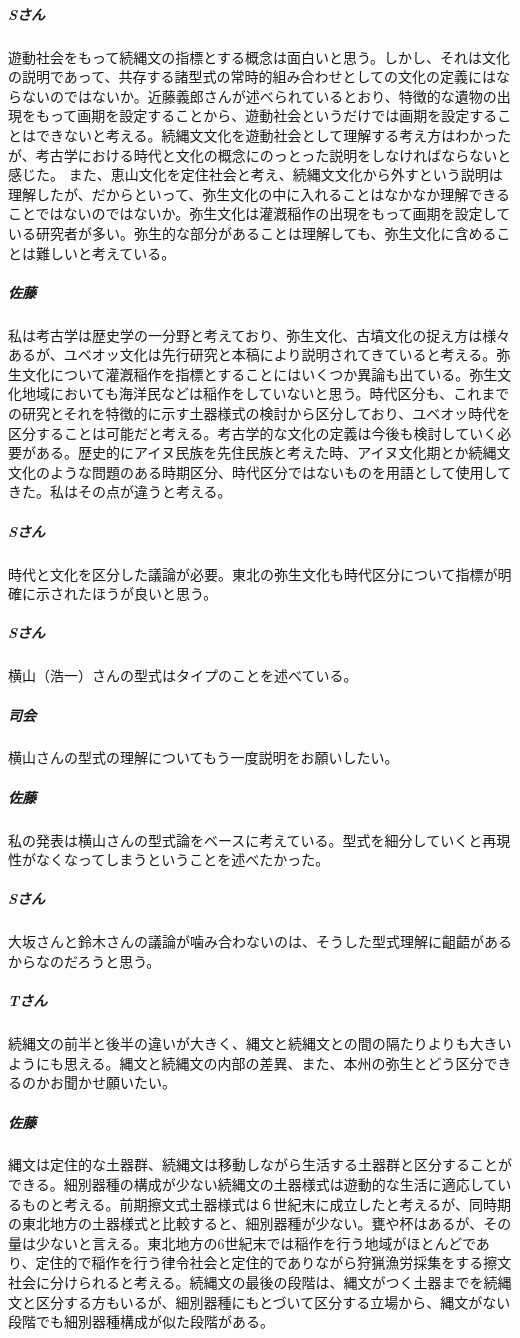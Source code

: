 \documentclass[a4j,11pt,twocolumn,openany]{jsbook}
\begin{document}
\subparagraph{Sさん}遊動社会をもって続縄文の指標とする概念は面白いと思う。しかし、それは文化の説明であって、共存する諸型式の常時的組み合わせとしての文化の定義にはならないのではないか。近藤義郎さんが述べられているとおり、特徴的な遺物の出現をもって画期を設定することから、遊動社会というだけでは画期を設定することはできないと考える。続縄文文化を遊動社会として理解する考え方はわかったが、考古学における時代と文化の概念にのっとった説明をしなければならないと感じた。
また、恵山文化を定住社会と考え、続縄文文化から外すという説明は理解したが、だからといって、弥生文化の中に入れることはなかなか理解できることではないのではないか。弥生文化は灌漑稲作の出現をもって画期を設定している研究者が多い。弥生的な部分があることは理解しても、弥生文化に含めることは難しいと考えている。
\subparagraph{佐藤}私は考古学は歴史学の一分野と考えており、弥生文化、古墳文化の捉え方は様々あるが、ユベオッ文化は先行研究と本稿により説明されてきていると考える。弥生文化について灌漑稲作を指標とすることにはいくつか異論も出ている。弥生文化地域においても海洋民などは稲作をしていないと思う。時代区分も、これまでの研究とそれを特徴的に示す土器様式の検討から区分しており、ユベオッ時代を区分することは可能だと考える。考古学的な文化の定義は今後も検討していく必要がある。歴史的にアイヌ民族を先住民族と考えた時、アイヌ文化期とか続縄文文化のような問題のある時期区分、時代区分ではないものを用語として使用してきた。私はその点が違うと考える。
\subparagraph{Sさん}時代と文化を区分した議論が必要。東北の弥生文化も時代区分について指標が明確に示されたほうが良いと思う。
\subparagraph{Sさん}横山（浩一）さんの型式はタイプのことを述べている。
\subparagraph{司会}横山さんの型式の理解についてもう一度説明をお願いしたい。
\subparagraph{佐藤}私の発表は横山さんの型式論をベースに考えている。型式を細分していくと再現性がなくなってしまうということを述べたかった。
\subparagraph{Sさん}大坂さんと鈴木さんの議論が噛み合わないのは、そうした型式理解に齟齬があるからなのだろうと思う。
\subparagraph{Tさん}続縄文の前半と後半の違いが大きく、縄文と続縄文との間の隔たりよりも大きいようにも思える。縄文と続縄文の内部の差異、また、本州の弥生とどう区分できるのかお聞かせ願いたい。
\subparagraph{佐藤}縄文は定住的な土器群、続縄文は移動しながら生活する土器群と区分することができる。細別器種の構成が少ない続縄文の土器様式は遊動的な生活に適応しているものと考える。前期擦文式土器様式は６世紀末に成立したと考えるが、同時期の東北地方の土器様式と比較すると、細別器種が少ない。甕や杯はあるが、その量は少ないと言える。東北地方の6世紀末では稲作を行う地域がほとんどであり、定住的で稲作を行う律令社会と定住的でありながら狩猟漁労採集をする擦文社会に分けられると考える。続縄文の最後の段階は、縄文がつく土器までを続縄文と区分する方もいるが、細別器種にもとづいて区分する立場から、縄文がない段階でも細別器種構成が似た段階がある。
\end{document}

